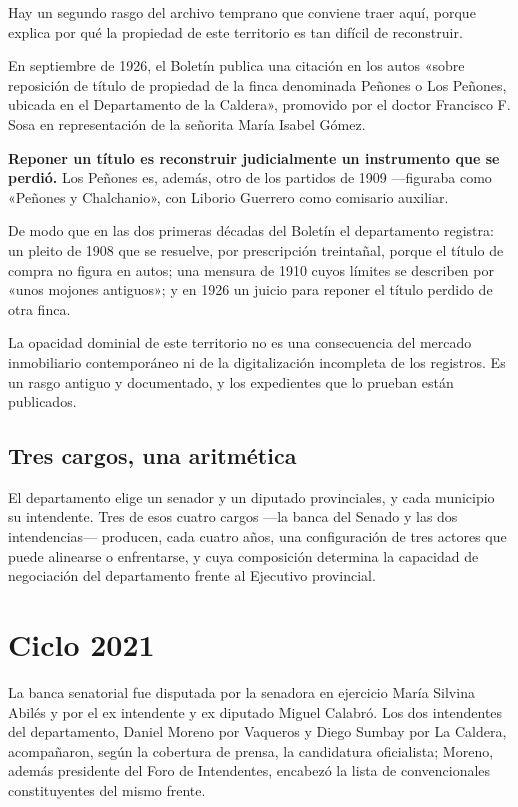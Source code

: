 Hay un segundo rasgo del archivo temprano que conviene traer aquí, porque explica por qué
la propiedad de este territorio es tan difícil de reconstruir.

En septiembre de 1926, el Boletín publica una citación en los autos «sobre reposición de
título de propiedad de la finca denominada Peñones o Los Peñones, ubicada en el
Departamento de la Caldera», promovido por el doctor Francisco F. Sosa en representación
de la señorita María Isabel Gómez.

\textbf{Reponer un título es reconstruir judicialmente un instrumento que se perdió.} Los
Peñones es, además, otro de los partidos de 1909 —figuraba como «Peñones y Chalchanio»,
con Liborio Guerrero como comisario auxiliar.

De modo que en las dos primeras décadas del Boletín el departamento registra: un pleito de
1908 que se resuelve, por prescripción treintañal, porque el título de compra no figura en autos; una mensura de 1910 cuyos límites se describen por
«unos mojones antiguos»; y en 1926 un juicio para reponer el título perdido de otra finca.

La opacidad dominial de este territorio no es una consecuencia del mercado inmobiliario
contemporáneo ni de la digitalización incompleta de los registros. Es un rasgo antiguo y
documentado, y los expedientes que lo prueban están publicados.

\subsection*{Tres cargos, una aritmética}

El departamento elige un senador y un diputado provinciales, y cada municipio su intendente. Tres de esos cuatro cargos ---la banca del Senado y las dos intendencias--- producen, cada cuatro años, una configuración de tres actores que puede alinearse o enfrentarse, y cuya composición determina la capacidad de negociación del departamento frente al Ejecutivo provincial.

\section{Ciclo 2021}

La banca senatorial fue disputada por la senadora en ejercicio María Silvina Abilés y por el ex intendente y ex diputado Miguel Calabró. Los dos intendentes del departamento, Daniel Moreno por Vaqueros y Diego Sumbay por La Caldera, acompañaron, según la cobertura de prensa, la candidatura oficialista; Moreno, además presidente del Foro de Intendentes, encabezó la lista de convencionales constituyentes del mismo frente.

